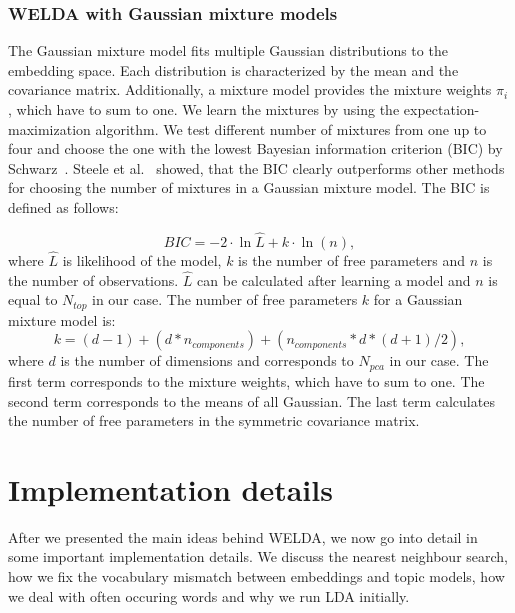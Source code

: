 \documentclass[
        a4paper,
        titlepage,
        twoside,
        parskip
        ]{scrbook}
\theoremstyle{break}
\begin{document}
\subsubsection{WELDA with Gaussian mixture models}
The Gaussian mixture model fits multiple Gaussian distributions to the embedding space.
Each distribution is characterized by the mean and the covariance matrix.
Additionally, a mixture model provides the mixture weights $\pi_i$, which have to sum to one.
We learn the mixtures by using the expectation-maximization algorithm.
We test different number of mixtures from one up to four and choose the one with the lowest Bayesian information criterion (BIC) by Schwarz~\cite{Schwarz1978}.
Steele et al.~\cite{Steele2009} showed, that the BIC clearly outperforms other methods for choosing the number of mixtures in a Gaussian mixture model.
The BIC is defined as follows:

\begin{equation*}
  BIC = {-2 \cdot \ln{\hat L} + k \cdot \ln(n)},
\end{equation*}
where $\hat{L}$ is likelihood of the model, $k$ is the number of free parameters and $n$ is the number of observations.
$\hat{L}$ can be calculated after learning a model and $n$ is equal to $N_{top}$ in our case.
The number of free parameters $k$ for a Gaussian mixture model is:
\begin{equation*}
  k = (d - 1) + (d * n_{components}) + (n_{components} * d * (d + 1)/2),
\end{equation*}
where $d$ is the number of dimensions and corresponds to $N_{pca}$ in our case.
The first term corresponds to the mixture weights, which have to sum to one.
The second term corresponds to the means of all Gaussian.
The last term calculates the number of free parameters in the symmetric covariance matrix.

\section{Implementation details}

After we presented the main ideas behind WELDA, we now go into detail in some important implementation details.
We discuss the nearest neighbour search, how we fix the vocabulary mismatch between embeddings and topic models, how we deal with often occuring words and why we run LDA initially.
\end{document}
